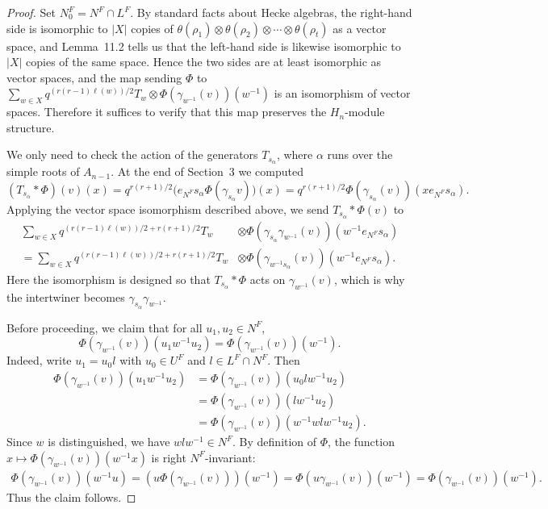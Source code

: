 \documentclass[12pt]{article}
\theoremstyle{remark}
\begin{document}
\begin{proof}
Set $N_0^F = N^F \cap L^F$. By standard facts about Hecke algebras, the right-hand side is isomorphic to $|X|$ copies of $\theta(\rho_1) \otimes \theta(\rho_2) \otimes \cdots \otimes \theta(\rho_t)$ as a vector space, and Lemma~11.2 tells us that the left-hand side is likewise isomorphic to $|X|$ copies of the same space. Hence the two sides are at least isomorphic as vector spaces, and the map sending $\Phi$ to $\sum_{w \in X} q^{(r(r-1)\ell(w))/2} T_w \otimes \Phi(\gamma_{w^{-1}}(v))(w^{-1})$ is an isomorphism of vector spaces. Therefore it suffices to verify that this map preserves the $H_n$-module structure.

We only need to check the action of the generators $T_{s_\alpha}$, where $\alpha$ runs over the simple roots of $A_{n-1}$. At the end of Section~3 we computed
$$
(T_{s_\alpha} * \Phi)(v)(x) = q^{r(r+1)/2} \bigl( e_{N^F} s_\alpha \Phi(\gamma_{s_\alpha} v) \bigr)(x) = q^{r(r+1)/2} \Phi(\gamma_{s_\alpha}(v))(x e_{N^F} s_\alpha).
$$
Applying the vector space isomorphism described above, we send $T_{s_\alpha} * \Phi(v)$ to
\begin{align*}
\sum_{w \in X} q^{(r(r-1)\ell(w))/2 + r(r+1)/2} T_w &\otimes \Phi(\gamma_{s_\alpha}\gamma_{w^{-1}}(v))(w^{-1} e_{N^F} s_\alpha) \\
= \sum_{w \in X} q^{(r(r-1)\ell(w))/2 + r(r+1)/2} T_w &\otimes \Phi(\gamma_{w^{-1}s_\alpha}(v))(w^{-1} e_{N^F} s_\alpha).
\end{align*}
Here the isomorphism is designed so that $T_{s_\alpha} * \Phi$ acts on $\gamma_{w^{-1}}(v)$, which is why the intertwiner becomes $\gamma_{s_\alpha} \gamma_{w^{-1}}$.

Before proceeding, we claim that for all $u_1, u_2 \in N^F$,
$$
\Phi(\gamma_{w^{-1}}(v))(u_1 w^{-1} u_2) = \Phi(\gamma_{w^{-1}}(v))(w^{-1}).
$$
Indeed, write $u_1 = u_0 l$ with $u_0 \in U^F$ and $l \in L^F \cap N^F$. Then
\begin{align*}
\Phi(\gamma_{w^{-1}}(v))(u_1 w^{-1} u_2)
&= \Phi(\gamma_{w^{-1}}(v))(u_0 l w^{-1} u_2) \\
&= \Phi(\gamma_{w^{-1}}(v))(l w^{-1} u_2) \\
&= \Phi(\gamma_{w^{-1}}(v))(w^{-1} w l w^{-1} u_2).
\end{align*}
Since $w$ is distinguished, we have $w l w^{-1} \in N^F$. By definition of $\Phi$, the function $x \mapsto \Phi(\gamma_{w^{-1}}(v))(w^{-1} x)$ is right $N^F$-invariant:
\begin{align*}
\Phi(\gamma_{w^{-1}}(v))(w^{-1} u)
= (u \Phi(\gamma_{w^{-1}}(v)))(w^{-1})
= \Phi(u \gamma_{w^{-1}}(v))(w^{-1})
= \Phi(\gamma_{w^{-1}}(v))(w^{-1}).
\end{align*}
Thus the claim follows.


\end{proof}
\end{document}
